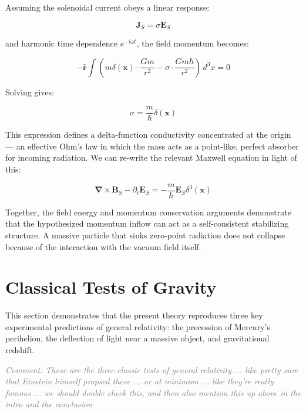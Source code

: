 \documentclass {article}
\renewcommand\vec{\mathbf}
\let\OldS\nabla
\renewcommand{\nabla}{\boldsymbol{\OldS}}
\let\OldHat\hat
\renewcommand{\hat}[1]{\OldHat{\mathbf{#1}}}
\newcommand{\comment}[1]{\textcolor{gray}{\small\textit{Comment: #1}}}
\begin{document}
Assuming the solenoidal current obeys a linear response:

\begin{equation}
\vec{J}_S = \sigma \vec{E}_S
\end{equation}

and harmonic time dependence \(e^{-i \omega t}\), the field momentum becomes:

\begin{equation}
-\hat{r} \int \left( m \delta(\vec{x}) \cdot \frac{G m}{r^2} - \sigma \cdot \frac{G m \hbar}{r^2} \right) \, d^3x = 0
\end{equation}

Solving gives:

\begin{equation}
\sigma = \frac{m}{\hbar} \delta(\vec{x})
\end{equation}

This expression defines a delta-function conductivity concentrated at the origin — an effective Ohm's law in which the mass acts as a point-like, perfect absorber for incoming radiation.  We can re-write the relevant Maxwell equation in light of this:

\begin{equation}
\nabla \times \vec{B}_S - \partial_t \vec{E}_S = -\frac{m}{\hbar} \vec{E}_S \delta^3(\vec{x})
\label{eq:ohm}
\end{equation}



Together, the field energy and momentum conservation arguments demonstrate that the hypothesized momentum inflow can act as a self-consistent stabilizing structure. A massive particle that sinks zero-point radiation does not collapse because of the interaction with the vacuum field itself.

	
\section{Classical Tests of Gravity}

This section demonstrates that the present theory reproduces three key experimental predictions of general relativity: the precession of Mercury's perihelion, the deflection of light near a massive object, and gravitational redshift. 

\comment{These are the three classic tests of general relativity ... like pretty sure that Einstein himself propsed these ... or at minimum ... like they're really famous ... we should double check this, and then also mention this up above in the intro and the conclusion} 
\end{document}
